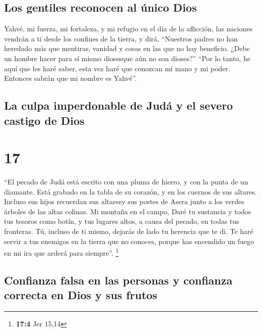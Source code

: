\hypertarget{los-gentiles-reconocen-al-uxfanico-dios}{%
\subsection{Los gentiles reconocen al único
Dios}\label{los-gentiles-reconocen-al-uxfanico-dios}}

 Yahvé, mi fuerza, mi fortaleza, y mi refugio en el día
de la aflicción, las naciones vendrán a ti desde los confines de la
tierra, y dirá, ``Nuestros padres no han heredado más que mentiras,
vanidad y cosas en las que no hay beneficio.  ¿Debe un
hombre hacer para sí mismo diosesque aún no son dioses?''
 ``Por lo tanto, he aquí que les haré saber, esta vez
haré que conozcan mi mano y mi poder. Entonces sabrán que mi nombre es
Yahvé''.

\hypertarget{la-culpa-imperdonable-de-juduxe1-y-el-severo-castigo-de-dios}{%
\subsection{La culpa imperdonable de Judá y el severo castigo de
Dios}\label{la-culpa-imperdonable-de-juduxe1-y-el-severo-castigo-de-dios}}

\hypertarget{section-16}{%
\section{17}\label{section-16}}

 ``El pecado de Judá está escrito con una pluma de hierro,
y con la punta de un diamante. Está grabado en la tabla de su corazón, y
en los cuernos de sus altares.  Incluso sus hijos
recuerdan sus altaresy sus postes de Asera junto a los verdes árboles de
las altas colinas.  Mi montaña en el campo, Daré tu
sustancia y todos tus tesoros como botín, y tus lugares altos, a causa
del pecado, en todas tus fronteras.  Tú, incluso de ti
mismo, dejarás de lado tu herencia que te di. Te haré servir a tus
enemigos en la tierra que no conoces, porque has encendido un fuego en
mi ira que arderá para siempre''. \footnote{\textbf{17:4} Jer 15,14}

\hypertarget{confianza-falsa-en-las-personas-y-confianza-correcta-en-dios-y-sus-frutos}{%
\subsection{Confianza falsa en las personas y confianza correcta en Dios
y sus
frutos}\label{confianza-falsa-en-las-personas-y-confianza-correcta-en-dios-y-sus-frutos}}

